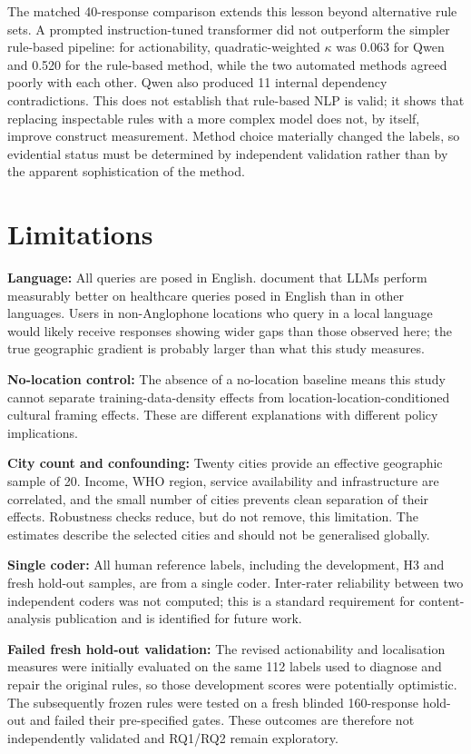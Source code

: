 The matched 40-response comparison extends this lesson beyond alternative rule sets. A prompted instruction-tuned transformer did not outperform the simpler rule-based pipeline: for actionability, quadratic-weighted $\kappa$ was 0.063 for Qwen and 0.520 for the rule-based method, while the two automated methods agreed poorly with each other. Qwen also produced 11 internal dependency contradictions. This does not establish that rule-based NLP is valid; it shows that replacing inspectable rules with a more complex model does not, by itself, improve construct measurement. Method choice materially changed the labels, so evidential status must be determined by independent validation rather than by the apparent sophistication of the method.

\section{Limitations}

\textbf{Language:} All queries are posed in English. \citet{jin2024english} document that LLMs perform measurably better on healthcare queries posed in English than in other languages. Users in non-Anglophone locations who query in a local language would likely receive responses showing wider gaps than those observed here; the true geographic gradient is probably larger than what this study measures.

\textbf{No-location control:} The absence of a no-location baseline means this study cannot separate training-data-density effects from location-location-conditioned cultural framing effects. These are different explanations with different policy implications.

\textbf{City count and confounding:} Twenty cities provide an effective geographic sample of 20. Income, WHO region, service availability and infrastructure are correlated, and the small number of cities prevents clean separation of their effects. Robustness checks reduce, but do not remove, this limitation. The estimates describe the selected cities and should not be generalised globally.

\textbf{Single coder:} All human reference labels, including the development, H3 and fresh hold-out samples, are from a single coder. Inter-rater reliability between two independent coders was not computed; this is a standard requirement for content-analysis publication and is identified for future work.

\textbf{Failed fresh hold-out validation:} The revised actionability and localisation measures were initially evaluated on the same 112 labels used to diagnose and repair the original rules, so those development scores were potentially optimistic. The subsequently frozen rules were tested on a fresh blinded 160-response hold-out and failed their pre-specified gates. These outcomes are therefore not independently validated and RQ1/RQ2 remain exploratory.

